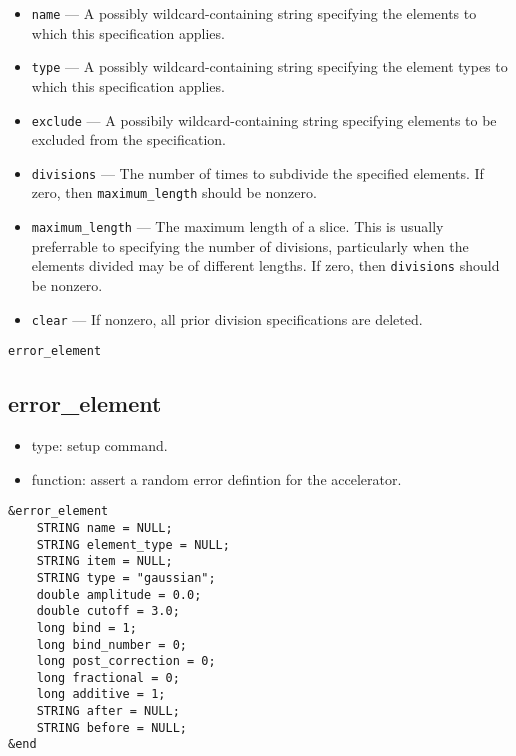 \documentclass[11pt]{article}
\begin{document}
\begin{itemize}
\item \verb|name| --- A possibly wildcard-containing string specifying
	the elements to which this specification applies.
\item \verb|type| --- A possibly wildcard-containing string specifying
 	the element types to which this specification applies.
\item \verb|exclude| --- A possibily wildcard-containing string specifying
 	elements to be excluded from the specification.
\item \verb|divisions| --- The number of times to subdivide the specified
	elements.  If zero, then \verb|maximum_length| should be nonzero.
\item \verb|maximum_length| --- The maximum length of a slice.  This is
	usually preferrable to specifying the number of divisions, particularly
	when the elements divided may be of different lengths.  If zero, then
	\verb|divisions| should be nonzero.
\item \verb|clear| --- If nonzero, all prior division specifications are
	deleted.
\end{itemize}

\begin{latexonly}
\newpage
\begin{center}{\Large\verb|error_element|}\end{center}
\end{latexonly}
\subsection{error\_element}

\begin{itemize}
\item type: setup command.
\item function: assert a random error defintion for the accelerator.
\end{itemize}

\begin{verbatim}
&error_element
    STRING name = NULL;
    STRING element_type = NULL;
    STRING item = NULL;
    STRING type = "gaussian";
    double amplitude = 0.0;
    double cutoff = 3.0;
    long bind = 1;
    long bind_number = 0;
    long post_correction = 0;
    long fractional = 0;
    long additive = 1;
    STRING after = NULL;
    STRING before = NULL;
&end
\end{verbatim}
\end{document}
